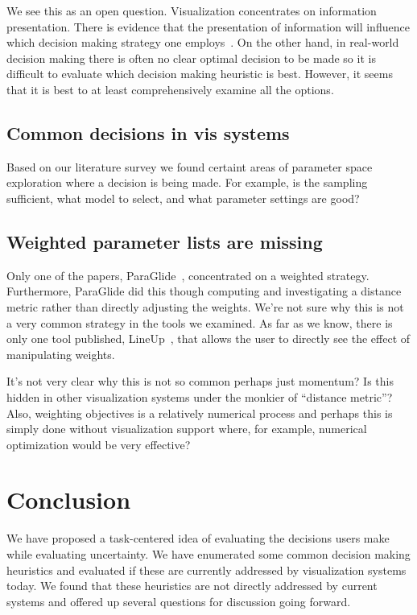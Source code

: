 We see this as an open question. Visualization concentrates on information
presentation. There is evidence that the presentation of information will
influence which decision making strategy one employs~\citep{Jarvenpaa:1990}.
On the other hand, in real-world decision making there is often no clear
optimal decision to be made so it is difficult to evaluate which decision
making heuristic is best. However, it seems that it is best to at least
comprehensively examine all the options.

\subsection{Common decisions in vis systems}
\label{common-decisions-in-vis-systems}

Based on our literature survey we found certaint areas of parameter space
exploration where a decision is being made.  For example, is the sampling
sufficient, what model to select, and what parameter settings are good?

\subsection{Weighted parameter lists are
missing}\label{weighted-parameter-lists-are-missing}

Only one of the papers, ParaGlide~\citep{Bergner:2013}, concentrated on a
weighted strategy. Furthermore, ParaGlide did this though computing and
investigating a distance metric rather than directly adjusting the
weights. We're not sure why this is not a very common strategy in the
tools we examined. As far as we know, there is only one tool published,
LineUp~\citep{Gratzl:2013}, that allows the user to directly see the
effect of manipulating weights.

It's not very clear why this is not so common perhaps just momentum? Is
this hidden in other visualization systems under the monkier of
``distance metric''? Also, weighting objectives is a relatively
numerical process and perhaps this is simply done without visualization
support where, for example, numerical optimization would be very
effective?

\section{Conclusion}

We have proposed a task-centered idea of evaluating the decisions users
make while evaluating uncertainty. We have enumerated some common decision
making heuristics and evaluated if these are currently addressed by 
visualization systems today. We found that these heuristics are not directly
addressed by current systems and offered up several questions for
discussion going forward.

